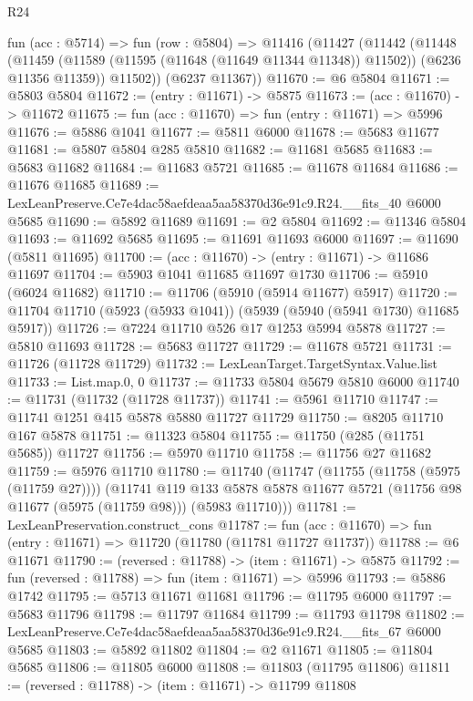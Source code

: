\begin{lexlean}{R24}
\begin{coremodule}
  fun (acc : @5714) =>
  fun (row : @5804) =>
  @11416
    (@11427
      (@11442
        (@11448
          (@11459 (@11589 (@11595 (@11648 (@11649 @11344 @11348)) @11502)) (@6236 @11356 @11359))
          @11502))
      (@6237 @11367))
@11670 := @6 @5804
@11671 := @5803 @5804
@11672 := (entry : @11671) -> @5875
@11673 := (acc : @11670) -> @11672
@11675 := fun (acc : @11670) => fun (entry : @11671) => @5996
@11676 := @5886 @1041
@11677 := @5811 @6000
@11678 := @5683 @11677
@11681 := @5807 @5804 @285 @5810
@11682 := @11681 @5685
@11683 := @5683 @11682
@11684 := @11683 @5721
@11685 := @11678 @11684
@11686 := @11676 @11685
@11689 := LexLeanPreserve.Ce7e4dac58aefdeaa5aa58370d36e91c9.R24.__fits_40 @6000 @5685
@11690 := @5892 @11689
@11691 := @2 @5804
@11692 := @11346 @5804
@11693 := @11692 @5685
@11695 := @11691 @11693 @6000
@11697 := @11690 (@5811 @11695)
@11700 := (acc : @11670) -> (entry : @11671) -> @11686 @11697
@11704 := @5903 @1041 @11685 @11697 @1730
@11706 := @5910 (@6024 @11682)
@11710 := @11706 (@5910 (@5914 @11677) @5917)
@11720 := @11704 @11710 (@5923 (@5933 @1041)) (@5939 (@5940 (@5941 @1730) @11685 @5917))
@11726 := @7224 @11710 @526 @17 @1253 @5994 @5878
@11727 := @5810 @11693
@11728 := @5683 @11727
@11729 := @11678 @5721
@11731 := @11726 (@11728 @11729)
@11732 := LexLeanTarget.TargetSyntax.Value.list
@11733 := List.map.{0, 0}
@11737 := @11733 @5804 @5679 @5810 @6000
@11740 := @11731 (@11732 (@11728 @11737))
@11741 := @5961 @11710
@11747 := @11741 @1251 @415 @5878 @5880 @11727 @11729
@11750 := @8205 @11710 @167 @5878
@11751 := @11323 @5804
@11755 := @11750 (@285 (@11751 @5685)) @11727
@11756 := @5970 @11710
@11758 := @11756 @27 @11682
@11759 := @5976 @11710
@11780 := @11740
    (@11747
      (@11755 (@11758 (@5975 (@11759 @27))))
      (@11741
        @119
        @133
        @5878
        @5878
        @11677
        @5721
        (@11756 @98 @11677 (@5975 (@11759 @98)))
        (@5983 @11710)))
@11781 := LexLeanPreservation.construct_cons
@11787 := fun (acc : @11670) => fun (entry : @11671) => @11720 (@11780 (@11781 @11727 @11737))
@11788 := @6 @11671
@11790 := (reversed : @11788) -> (item : @11671) -> @5875
@11792 := fun (reversed : @11788) => fun (item : @11671) => @5996
@11793 := @5886 @1742
@11795 := @5713 @11671 @11681
@11796 := @11795 @6000
@11797 := @5683 @11796
@11798 := @11797 @11684
@11799 := @11793 @11798
@11802 := LexLeanPreserve.Ce7e4dac58aefdeaa5aa58370d36e91c9.R24.__fits_67 @6000 @5685
@11803 := @5892 @11802
@11804 := @2 @11671
@11805 := @11804 @5685
@11806 := @11805 @6000
@11808 := @11803 (@11795 @11806)
@11811 := (reversed : @11788) -> (item : @11671) -> @11799 @11808

\end{coremodule}
\end{lexlean}
